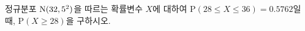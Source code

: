 정규분포 $\mathrm{N}(32{,}\mkern3mu\mathopen{}5^2)$을 따르는 확률변수 $X$에 대하여 $\mathrm{P}(28\le X\le 36)=0.5762$일 때, $\mathrm{P}(X\ge 28)$을 구하시오.
